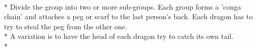 \begin{minipage}{\textwidth}
\\*
Divide the group into two or more sub-groups.  Each group forms a 'conga chain' and attaches a peg or scarf to the last person's back.  Each dragon has to try to steal the peg from the other one.\\*
A variation is to have the head of each dragon try to catch its own tail.\\*
\end{minipage}    \vfill
